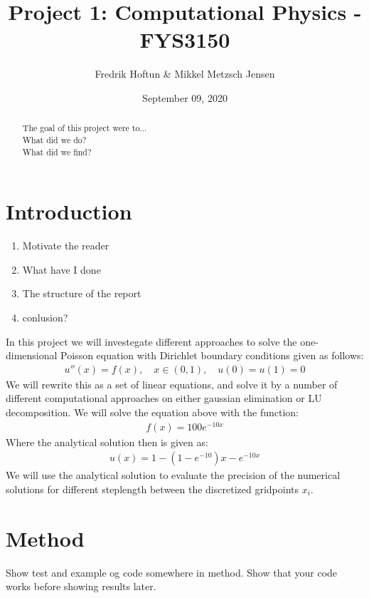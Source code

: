 \documentclass[american,a4paper,12pt]{article}
\title{Project 1: Computational Physics - FYS3150}
\author{Fredrik Hoftun \& Mikkel Metzsch Jensen}
\date{September 09, 2020}
\begin{document}
\maketitle

\tableofcontents


\begin{abstract}
  The goal of this project were to... \\
  What did we do? \\
  What did we find? \\
\end{abstract}

\section{Introduction}

  \begin{enumerate}
    \item Motivate the reader
    \item What have I done
    \item The structure of the report
    \item conlusion?
  \end{enumerate}


  In this project we will investegate different approaches to solve the one-dimensional Poisson equation with Dirichlet boundary conditions given as follows:
  \begin{align*}
    u''(x) = f(x), \quad x \in (0,1), \quad u(0) = u(1) = 0
  \end{align*}
  We will rewrite this as a set of linear equations, and solve it by a number of different computational approaches on either gaussian elimination or LU decomposition. We will solve the equation above with the function:
  \begin{align*}
    f(x) = 100e^{-10x}
  \end{align*}
  Where the analytical solution then is given as:
  \begin{align*}
    u(x) = 1 - (1 - e^{-10})x - e^{-10x}
  \end{align*}
  We will use the analytical solution to evaluate the precision of the numerical solutions for different steplength between the discretized gridpoints $x_i$.


\section{Method}
   Show test and example og code somewhere in method. Show that your code works before showing results later.
\end{document}
